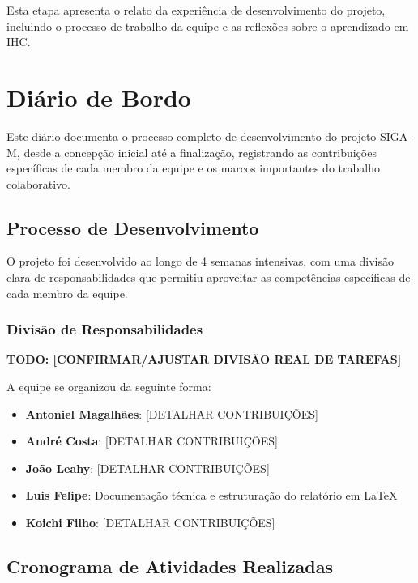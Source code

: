 \documentclass[12pt, a4paper]{report}
\begin{document}
Esta etapa apresenta o relato da experiência de desenvolvimento do projeto, incluindo o processo de trabalho da equipe e as reflexões sobre o aprendizado em IHC.

\section{Diário de Bordo}

Este diário documenta o processo completo de desenvolvimento do projeto SIGA-M, desde a concepção inicial até a finalização, registrando as contribuições específicas de cada membro da equipe e os marcos importantes do trabalho colaborativo.

\subsection{Processo de Desenvolvimento}

O projeto foi desenvolvido ao longo de 4 semanas intensivas, com uma divisão clara de responsabilidades que permitiu aproveitar as competências específicas de cada membro da equipe.

\subsubsection{Divisão de Responsabilidades}

\textbf{TODO: [CONFIRMAR/AJUSTAR DIVISÃO REAL DE TAREFAS]}

A equipe se organizou da seguinte forma:

\begin{itemize}
    \item \textbf{Antoniel Magalhães}: [DETALHAR CONTRIBUIÇÕES]
    \item \textbf{André Costa}: [DETALHAR CONTRIBUIÇÕES]
    \item \textbf{João Leahy}: [DETALHAR CONTRIBUIÇÕES]
    \item \textbf{Luis Felipe}: Documentação técnica e estruturação do relatório em LaTeX
    \item \textbf{Koichi Filho}: [DETALHAR CONTRIBUIÇÕES]
\end{itemize}

\subsection{Cronograma de Atividades Realizadas}
\end{document}

